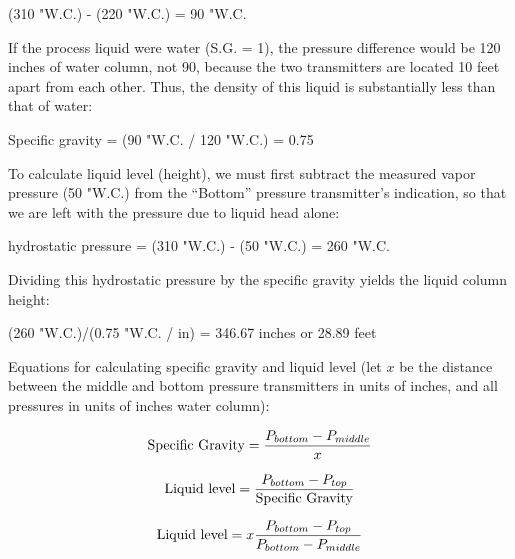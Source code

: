 \vskip 10pt

(310 "W.C.) - (220 "W.C.) = 90 "W.C.

\vskip 10pt

If the process liquid were water (S.G. = 1), the pressure difference would be 120 inches of water column, not 90, because the two transmitters are located 10 feet apart from each other.  Thus, the density of this liquid is substantially less than that of water:

\vskip 10pt

Specific gravity = (90 "W.C. / 120 "W.C.) = 0.75

\vskip 10pt

To calculate liquid level (height), we must first subtract the measured vapor pressure (50 "W.C.) from the ``Bottom'' pressure transmitter's indication, so that we are left with the pressure due to liquid head alone:

\vskip 10pt

hydrostatic pressure = (310 "W.C.) - (50 "W.C.) = 260 "W.C. 

\vskip 10pt

Dividing this hydrostatic pressure by the specific gravity yields the liquid column height:

\vskip 10pt

(260 "W.C.)/(0.75 "W.C. / in) = 346.67 inches or 28.89 feet

\vskip 30pt

Equations for calculating specific gravity and liquid level (let $x$ be the distance between the middle and bottom pressure transmitters in units of inches, and all pressures in units of inches water column):

$$\hbox{Specific Gravity} = {{P_{bottom} - P_{middle}} \over x}$$

\vskip 10pt

$$\hbox{Liquid level} = {{P_{bottom} - P_{top}} \over \hbox{Specific Gravity}}$$

$$\hbox{Liquid level} = x{{P_{bottom} - P_{top}} \over {P_{bottom} - P_{middle}}}$$











